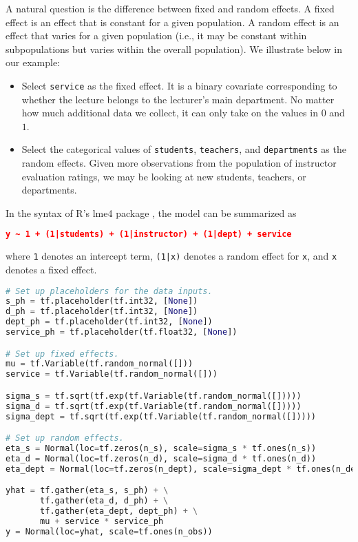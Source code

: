A natural question is the difference between fixed and random effects.
A fixed effect is an effect that is constant for a given population. A
random effect is an effect that varies for a given population (i.e.,
it may be constant within subpopulations but varies within the overall
population). We illustrate below in our example:

\begin{itemize}
\item
Select \texttt{service} as the fixed effect. It is a binary covariate
corresponding to whether the lecture belongs to the lecturer's main
department. No matter how much additional data we collect, it
can only take on the values in $0$ and $1$.
\item
Select the categorical values of \texttt{students}, \texttt{teachers},
and \texttt{departments} as the random effects. Given more
observations from the population of instructor evaluation ratings, we
may be looking at new students, teachers, or departments.
\end{itemize}

In the syntax of R's lme4 package \citep{bates2015fitting}, the model
can be summarized as

\begin{lstlisting}[language=JSON]
y ~ 1 + (1|students) + (1|instructor) + (1|dept) + service
\end{lstlisting}
where \texttt{1} denotes an intercept term, \texttt{(1|x)} denotes a
random effect for  \texttt{x}, and \texttt{x} denotes a fixed effect.

\begin{lstlisting}[language=Python]
# Set up placeholders for the data inputs.
s_ph = tf.placeholder(tf.int32, [None])
d_ph = tf.placeholder(tf.int32, [None])
dept_ph = tf.placeholder(tf.int32, [None])
service_ph = tf.placeholder(tf.float32, [None])

# Set up fixed effects.
mu = tf.Variable(tf.random_normal([]))
service = tf.Variable(tf.random_normal([]))

sigma_s = tf.sqrt(tf.exp(tf.Variable(tf.random_normal([]))))
sigma_d = tf.sqrt(tf.exp(tf.Variable(tf.random_normal([]))))
sigma_dept = tf.sqrt(tf.exp(tf.Variable(tf.random_normal([]))))

# Set up random effects.
eta_s = Normal(loc=tf.zeros(n_s), scale=sigma_s * tf.ones(n_s))
eta_d = Normal(loc=tf.zeros(n_d), scale=sigma_d * tf.ones(n_d))
eta_dept = Normal(loc=tf.zeros(n_dept), scale=sigma_dept * tf.ones(n_dept))

yhat = tf.gather(eta_s, s_ph) + \
       tf.gather(eta_d, d_ph) + \
       tf.gather(eta_dept, dept_ph) + \
       mu + service * service_ph
y = Normal(loc=yhat, scale=tf.ones(n_obs))
\end{lstlisting}

